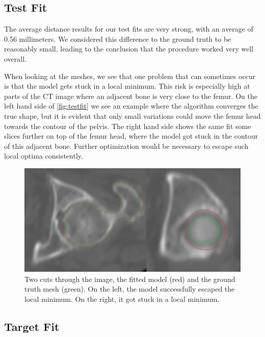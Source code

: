 
\subsection{Test Fit}
\label{subsec:testfit}

The average distance results for our test fits are very strong, with an average of 0.56 millimeters. 
We considered this difference to the ground truth to be reasonably small, leading to the conclusion that the procedure worked very well overall. 

When looking at the meshes, we see that one problem that can sometimes occur is that the model gets stuck in a local minimum.
This risk is especially high at parts of the CT image where an adjacent bone is very close to the femur. 
On the left hand side of \autoref{fig:testfit} we see an example where the algorithm converges the true shape, but it is evident that only small variations could move the femur head towards the contour of the pelvis.
The right hand side shows the same fit some slices further on top of the femur head, where the model got stuck in the contour of this adjacent bone.
Further optimization would be necessary to escape such local optima consistently.

\begin{figure}
	\centering
  \includegraphics[width=\columnwidth]{./Figures/local_minimum_comparison}
  \caption{
    Two cuts through the image, the fitted model (red) and the ground truth mesh (green).
    On the left, the model successfully escaped the local minimum.
    On the right, it got stuck in a local minimum.
  }
  \label{fig:testfit}
\end{figure}


\subsection{Target Fit}
\label{subsec:targetfit}

